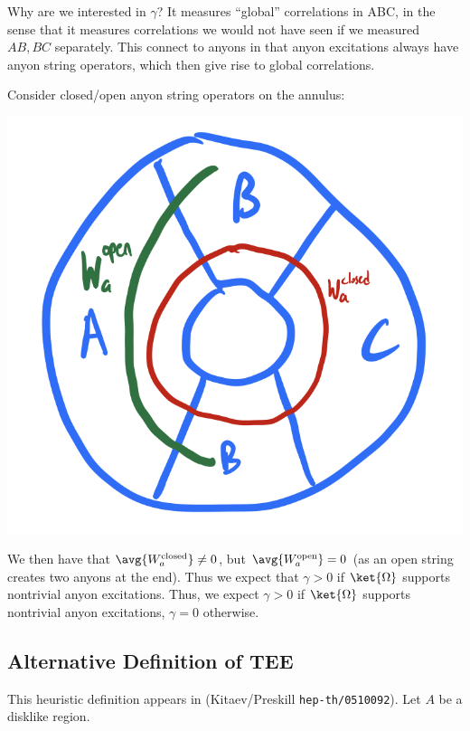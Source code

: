Why are we interested in $\gamma$? It measures ``global'' correlations in ABC, in the sense that it measures correlations we would not have seen if we measured $AB, BC$ separately. This connect to anyons in that anyon excitations always have anyon string operators, which then give rise to global correlations.

Consider closed/open anyon string operators on the annulus:

\begin{center}
    \includegraphics[scale=0.35]{Lectures/Images/lec17-stringops.png}
\end{center}

We then have that $\avg{W_a^{\text{closed}}} \neq 0$, but $\avg{W_a^{\text{open}}} = 0$ (as an open string creates two anyons at the end). Thus we expect that $\gamma > 0$ if $\ket{\Omega}$ supports nontrivial anyon excitations. Thus, we expect $\gamma > 0$ if $\ket{\Omega}$ supports nontrivial anyon excitations, $\gamma = 0$ otherwise.

\subsection{Alternative Definition of TEE}
This heuristic definition appears in (Kitaev/Preskill \texttt{hep-th/0510092}). Let $A$ be a disklike region.

